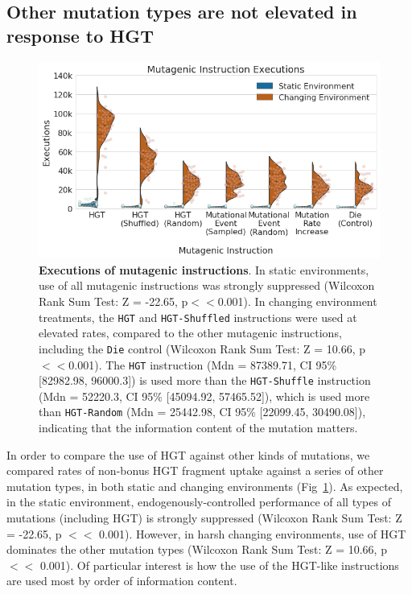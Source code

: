 \documentclass[PhD]{msu-thesis}
\begin{document}
\subsection{Other mutation types are not elevated in response to HGT}
	\begin{figure}[h!]
	\begin{center}
	\includegraphics[width=0.95\columnwidth]{figures/HGT/mutagen_execution.png}
	\caption{\textbf{Executions of mutagenic instructions}. In static environments, use of all mutagenic instructions was strongly suppressed (Wilcoxon Rank Sum Test: Z = -22.65, p$<<$0.001). In changing environment treatments, the \texttt{HGT} and \texttt{HGT-Shuffled} instructions were used at elevated rates, compared to the other mutagenic instructions, including the \texttt{Die} control (Wilcoxon Rank Sum Test:
	Z = 10.66, p$<<$0.001). The \texttt{HGT} instruction (Mdn = 87389.71, CI 95\% [82982.98, 96000.3]) is used more than the \texttt{HGT-Shuffle} instruction (Mdn = 52220.3, CI 95\% [45094.92, 57465.52]), which is used more than \texttt{HGT-Random} (Mdn
	= 25442.98, CI 95\% [22099.45, 30490.08]), indicating that the information content of the mutation matters. 
	}\label{fig:mutagen_execution}
	\end{center}
	\end{figure}
In order to compare the use of HGT against other kinds of mutations, we compared rates of non-bonus HGT fragment uptake against a series of other mutation types, in both static and changing environments (Fig~\ref{fig:mutagen_execution}). As expected, in the static environment, endogenously-controlled performance of all types of mutations (including HGT) is strongly suppressed (Wilcoxon Rank Sum Test: Z = -22.65, p $<<$ 0.001). However, in harsh changing environments, use of HGT dominates the other mutation types (Wilcoxon Rank Sum Test: Z = 10.66, p $<<$ 0.001). Of particular interest is how the use of the HGT-like instructions are used most by order of information content. 
\end{document}
